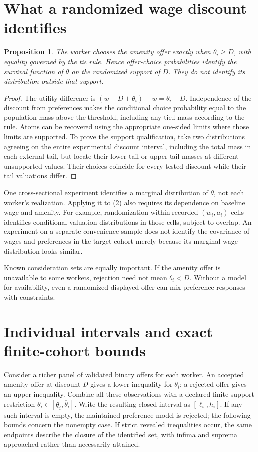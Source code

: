 \documentclass[11pt,a4paper]{article}
\newtheorem{proposition}[theorem]{Proposition}
\begin{document}
\section{What a randomized wage discount identifies}
\begin{proposition}
The worker chooses the amenity offer exactly when $\theta_i\ge D$, with equality governed by the tie rule. Hence offer-choice probabilities identify the survival function of $\theta$ on the randomized support of $D$. They do not identify its distribution outside that support.
\end{proposition}
\begin{proof}
The utility difference is $(w-D+\theta_i)-w=\theta_i-D$. Independence of the discount from preferences makes the conditional choice probability equal to the population mass above the threshold, including any tied mass according to the rule. Atoms can be recovered using the appropriate one-sided limits where those limits are supported. To prove the support qualification, take two distributions agreeing on the entire experimental discount interval, including the total mass in each external tail, but locate their lower-tail or upper-tail masses at different unsupported values. Their choices coincide for every tested discount while their tail valuations differ.
\end{proof}
One cross-sectional experiment identifies a marginal distribution of $\theta$, not each worker's realization. Applying it to (2) also requires its dependence on baseline wage and amenity. For example, randomization within recorded $(w_i,a_i)$ cells identifies conditional valuation distributions in those cells, subject to overlap. An experiment on a separate convenience sample does not identify the covariance of wages and preferences in the target cohort merely because its marginal wage distribution looks similar.

Known consideration sets are equally important. If the amenity offer is unavailable to some workers, rejection need not mean $\theta_i<D$. Without a model for availability, even a randomized displayed offer can mix preference responses with constraints.
\section{Individual intervals and exact finite-cohort bounds}
Consider a richer panel of validated binary offers for each worker. An accepted amenity offer at discount $D$ gives a lower inequality for $\theta_i$; a rejected offer gives an upper inequality. Combine all these observations with a declared finite support restriction $\theta_i\in[\underline\theta_i,\overline\theta_i]$. Write the resulting closed interval as $[\ell_i,h_i]$. If any such interval is empty, the maintained preference model is rejected; the following bounds concern the nonempty case. If strict revealed inequalities occur, the same endpoints describe the closure of the identified set, with infima and suprema approached rather than necessarily attained.
\end{document}
